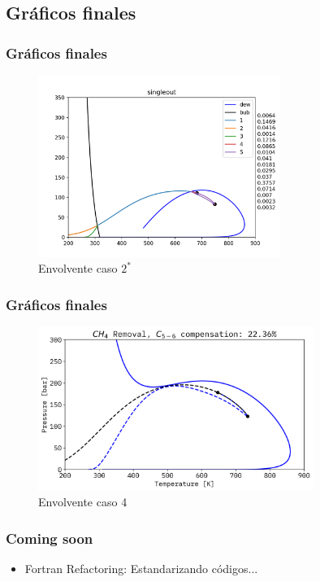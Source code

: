 \documentclass[aspectratio=1610,multi,rgb]{beamer}
\begin{document}
\subsection{Gráficos finales}

\begin{frame}[c]
    \frametitle{Gráficos finales}
\begin{figure}[htpb]
    \centering
    \includegraphics[width=0.7\textwidth]{figs/envelopeex1.png}
    \caption{Envolvente caso $2^*$}
    \label{fig:}
\end{figure}
    
\end{frame}

\begin{frame}[c]
    \frametitle{Gráficos finales}

\begin{figure}[htpb]
    \centering
    \includegraphics[width=0.8\textwidth]{figs/envelopeex2.png}
    \caption{Envolvente caso 4}
    \label{fig:figs-envelopeex2-png}
\end{figure}
\end{frame}


\begin{frame}[c]
    \frametitle{Coming soon}

    \begin{itemize}
        \item Fortran Refactoring: Estandarizando códigos...
    \end{itemize}

\end{frame}
\end{document}
